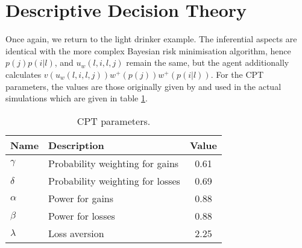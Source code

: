 \section{Descriptive Decision Theory}
\label{sub:cpt_eg}

Once again, we return to the light drinker example.  The inferential aspects are identical with the more complex Bayesian risk minimisation algorithm, hence \(p(j)p(i | l)\), and \(u_{w}(l, i, l, j)\) remain the same, but the agent additionally calculates $v(u_{w}(l, i, l, j))w^{+}(p(j))w^{+}(p(i | l))$. For the \ac{CPT} parameters, the values are those originally given by \citet{Tversky1992} and used in the actual simulations which are given in table \ref{tab:cpt_params}.

\begin{table}[H]\centering
\caption[\ac{CPT} parameters used in exemplar agent caclculations]{\ac{CPT} parameters. \label{tab:cpt_params}}
\begin{tabular}{llc}
\hline
Name & Description & Value \\ \hline
\(\gamma\) & Probability weighting for gains  & 0.61 \\ \hline
\(\delta\) & Probability weighting for losses &  0.69\\ \hline
\(\alpha\) & Power for gains  & 0.88 \\ \hline
\(\beta\) & Power for losses & 0.88 \\ \hline
\(\lambda\) & Loss aversion &  2.25 \\ \hline
\end{tabular}
\end{table}


